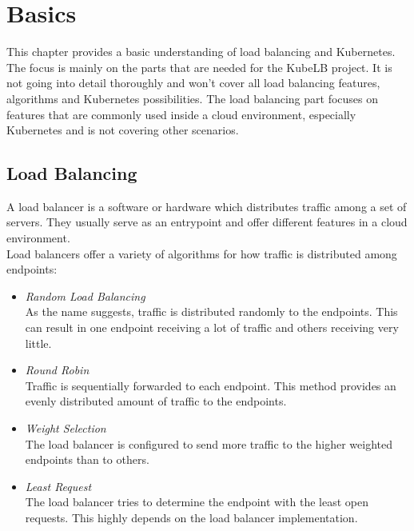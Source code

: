\chapter{Basics}\label{basics}

This chapter provides a basic understanding of load balancing and Kubernetes.
The focus is mainly on the parts that are needed for the KubeLB project.
It is not going into detail thoroughly and won't cover all load balancing features, algorithms and Kubernetes possibilities.
The load balancing part focuses on features that are commonly used inside a cloud environment, especially Kubernetes and is not covering other scenarios.

\section{Load Balancing}

A load balancer is a software or hardware which distributes traffic among a set of servers.
They usually serve as an entrypoint and offer different features in a cloud environment.
\\
Load balancers offer a variety of algorithms for how traffic is distributed among endpoints:

\begin{itemize}\label{item:lb-algorithms}
    \item \textit{Random Load Balancing} \\
    As the name suggests, traffic is distributed randomly to the endpoints.
    This can result in one endpoint receiving a lot of traffic and others receiving very little.
    \item \textit{Round Robin} \\
    Traffic is sequentially forwarded to each endpoint.
    This method provides an evenly distributed amount of traffic to the endpoints.
    \item \textit{Weight Selection} \\
    The load balancer is configured to send more traffic to the higher weighted endpoints than to others.
    \item \textit{Least Request} \\
    The load balancer tries to determine the endpoint with the least open requests.
    This highly depends on the load balancer implementation.
\end{itemize}

